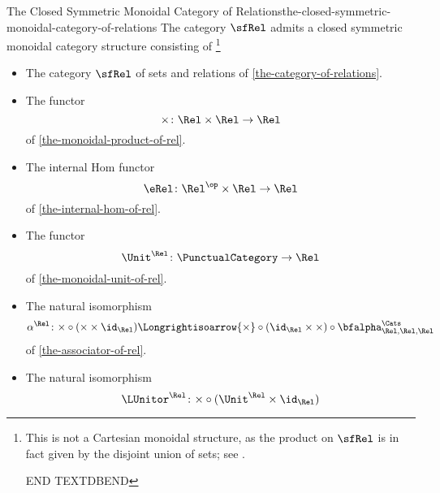\begin{proposition}{The Closed Symmetric Monoidal Category of Relations}{the-closed-symmetric-monoidal-category-of-relations}%
    The category $\sfRel$ admits a closed symmetric monoidal category structure consisting of%
    \footnote{%
        \textdbend{}This is not a Cartesian monoidal structure, as the product on $\sfRel$ is in fact given by the disjoint union of sets; see .

        END TEXTDBEND
        \par\vspace*{-1.75\baselineskip}
    }%
    \begin{itemize}
        \item{}The category $\sfRel$ of sets and relations of \cref{the-category-of-relations}.
        \item{}The functor
            \[
                \times%
                \colon%
                \Rel\times\Rel%
                \to%
                \Rel
            \]%
            of \cref{the-monoidal-product-of-rel}.
        \item{}The internal Hom functor
            \[
                \eRel%
                \colon%
                \Rel^{\op}\times\Rel%
                \to%
                \Rel%
            \]%
            of \cref{the-internal-hom-of-rel}.
        \item{}The functor
            \[
                \Unit^{\Rel}
                \colon
                \PunctualCategory
                \to
                \Rel
            \]
            of \cref{the-monoidal-unit-of-rel}.
        \item{}The natural isomorphism
            \[
                \alpha^{\Rel}
                \colon
                {\times}\circ{({\times}\times\id_{\Rel})}
                \Longrightisoarrow
                {\times}\circ{(\id_{\Rel}\times{\times})}\circ{\bfalpha^{\Cats}_{\Rel,\Rel,\Rel}}
            \]
            of \cref{the-associator-of-rel}.
        \item{}The natural isomorphism
            \[
                \LUnitor^{\Rel}%
                \colon%
                {\times}\circ{(\Unit^{\Rel}\times\id_{\Rel})}
\]
\end{itemize}
\end{proposition}
